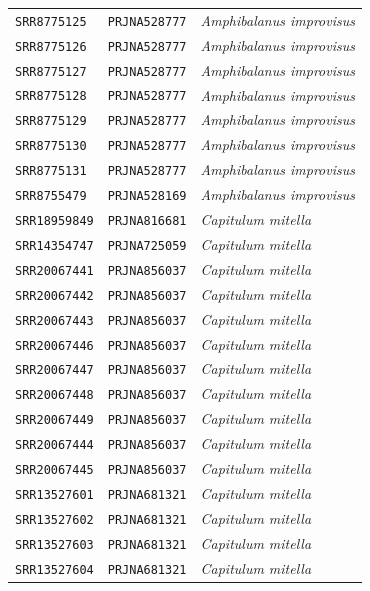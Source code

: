 \begin{table}[ht]
\begin{tabular}{lll}
            \texttt{SRR8775125}  & \texttt{PRJNA528777} & \textit{Amphibalanus improvisus} \\
            \texttt{SRR8775126}  & \texttt{PRJNA528777} & \textit{Amphibalanus improvisus} \\
            \texttt{SRR8775127}  & \texttt{PRJNA528777} & \textit{Amphibalanus improvisus} \\
            \texttt{SRR8775128}  & \texttt{PRJNA528777} & \textit{Amphibalanus improvisus} \\
            \texttt{SRR8775129}  & \texttt{PRJNA528777} & \textit{Amphibalanus improvisus} \\
            \texttt{SRR8775130}  & \texttt{PRJNA528777} & \textit{Amphibalanus improvisus} \\
            \texttt{SRR8775131}  & \texttt{PRJNA528777} & \textit{Amphibalanus improvisus} \\
            \texttt{SRR8755479}  & \texttt{PRJNA528169} & \textit{Amphibalanus improvisus} \\
            \texttt{SRR18959849} & \texttt{PRJNA816681} & \textit{Capitulum mitella} \\
            \texttt{SRR14354747} & \texttt{PRJNA725059} & \textit{Capitulum mitella} \\
            \texttt{SRR20067441} & \texttt{PRJNA856037} & \textit{Capitulum mitella} \\
            \texttt{SRR20067442} & \texttt{PRJNA856037} & \textit{Capitulum mitella} \\
            \texttt{SRR20067443} & \texttt{PRJNA856037} & \textit{Capitulum mitella} \\
            \texttt{SRR20067446} & \texttt{PRJNA856037} & \textit{Capitulum mitella} \\
            \texttt{SRR20067447} & \texttt{PRJNA856037} & \textit{Capitulum mitella} \\
            \texttt{SRR20067448} & \texttt{PRJNA856037} & \textit{Capitulum mitella} \\
            \texttt{SRR20067449} & \texttt{PRJNA856037} & \textit{Capitulum mitella} \\
            \texttt{SRR20067444} & \texttt{PRJNA856037} & \textit{Capitulum mitella} \\
            \texttt{SRR20067445} & \texttt{PRJNA856037} & \textit{Capitulum mitella} \\
            \texttt{SRR13527601} & \texttt{PRJNA681321} & \textit{Capitulum mitella} \\
            \texttt{SRR13527602} & \texttt{PRJNA681321} & \textit{Capitulum mitella} \\
            \texttt{SRR13527603} & \texttt{PRJNA681321} & \textit{Capitulum mitella} \\
            \texttt{SRR13527604} & \texttt{PRJNA681321} & \textit{Capitulum mitella} \\
        \bottomrule
    \end{tabular}
    \label{tab:sup_sra_data}
\end{table}

